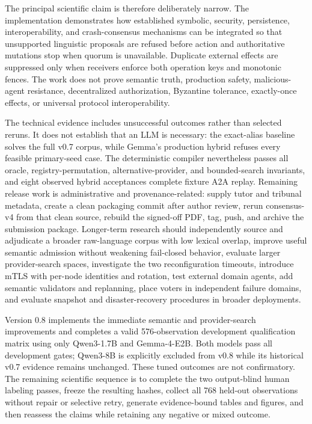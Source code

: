 The principal scientific claim is therefore deliberately narrow. The implementation demonstrates how established symbolic, security, persistence, interoperability, and crash-consensus mechanisms can be integrated so that unsupported linguistic proposals are refused before action and authoritative mutations stop when quorum is unavailable. Duplicate external effects are suppressed only when receivers enforce both operation keys and monotonic fences. The work does not prove semantic truth, production safety, malicious-agent resistance, decentralized authorization, Byzantine tolerance, exactly-once effects, or universal protocol interoperability.

The technical evidence includes unsuccessful outcomes rather than selected reruns. It does not establish that an LLM is necessary: the exact-alias baseline solves the full v0.7 corpus, while Gemma's production hybrid refuses every feasible primary-seed case. The deterministic compiler nevertheless passes all oracle, registry-permutation, alternative-provider, and bounded-search invariants, and eight observed hybrid acceptances complete fixture A2A replay. Remaining release work is administrative and provenance-related: supply tutor and tribunal metadata, create a clean packaging commit after author review, rerun consensus-v4 from that clean source, rebuild the signed-off PDF, tag, push, and archive the submission package. Longer-term research should independently source and adjudicate a broader raw-language corpus with low lexical overlap, improve useful semantic admission without weakening fail-closed behavior, evaluate larger provider-search spaces, investigate the two reconfiguration timeouts, introduce mTLS with per-node identities and rotation, test external domain agents, add semantic validators and replanning, place voters in independent failure domains, and evaluate snapshot and disaster-recovery procedures in broader deployments.

Version 0.8 implements the immediate semantic and provider-search improvements and completes a valid 576-observation development qualification matrix using only Qwen3-1.7B and Gemma-4-E2B. Both models pass all development gates; Qwen3-8B is explicitly excluded from v0.8 while its historical v0.7 evidence remains unchanged. These tuned outcomes are not confirmatory. The remaining scientific sequence is to complete the two output-blind human labeling passes, freeze the resulting hashes, collect all 768 held-out observations without repair or selective retry, generate evidence-bound tables and figures, and then reassess the claims while retaining any negative or mixed outcome.
